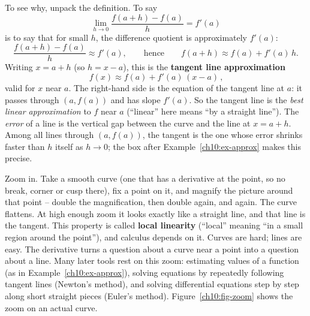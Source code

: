 To see why, unpack the definition. To say
\[
  \lim_{h \to 0} \frac{f(a + h) - f(a)}{h} = f'(a)
\]
is to say that for small $h$, the difference quotient is approximately $f'(a)$:
\[
  \frac{f(a + h) - f(a)}{h} \approx f'(a),
  \qquad\text{hence}\qquad
  f(a + h) \approx f(a) + f'(a)\,h.
\]
Writing $x = a + h$ (so $h = x - a$), this is the \textbf{tangent line
approximation}
\[
  \boxed{\,f(x) \approx f(a) + f'(a)\,(x - a)\,},
\]
valid for $x$ near $a$. The right-hand side is the equation of the
tangent line at $a$: it passes through $(a, f(a))$ and has slope $f'(a)$. So the
tangent line is the \emph{best linear approximation} to $f$ near $a$
(``linear'' here means ``by a straight line''). The \emph{error} of a line is the
vertical gap between the curve and the line at $x = a + h$. Among all lines
through $(a, f(a))$, the tangent is the one whose error shrinks faster than $h$
itself as $h \to 0$; the box after Example~\ref{ch10:ex-approx} makes this
precise.

\begin{intuitionbox}
Zoom in. Take a smooth curve (one that has a derivative at the point, so no
break, corner or cusp there), fix a point on it, and magnify
the picture around that point -- double the magnification, then double again,
and again. The curve flattens. At high enough zoom it looks exactly like a
straight line, and that line is the tangent. This property is called
\textbf{local linearity} (``local'' meaning ``in a small region around the
point''), and calculus depends on it. Curves are hard; lines are easy. The
derivative turns a question about a curve near a point into a question about a
line. Many later tools rest on this zoom: estimating values of a function (as in
Example~\ref{ch10:ex-approx}), solving equations by repeatedly following tangent
lines (Newton's method), and solving differential equations step by step along
short straight pieces (Euler's method).
Figure~\ref{ch10:fig-zoom} shows the zoom on an actual curve.
\end{intuitionbox}

